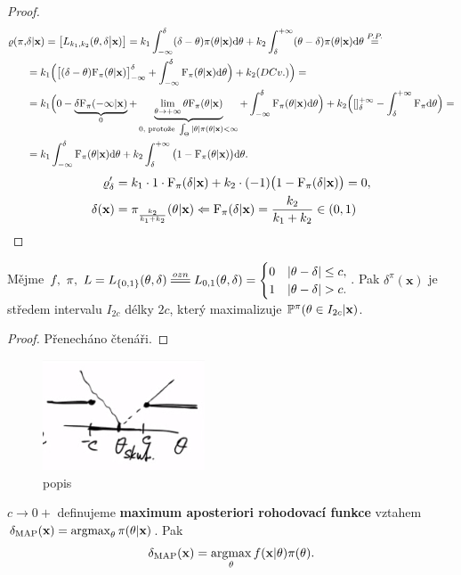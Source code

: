 \begin{theorem}
\begin{enumerate}[a:]
		\begin{proof}
			\[
			\begin{split}
			\varrho(\pi,&\delta|\textbf{x})=\big[L_{k_1,k_2}(\theta,\delta\big| \textbf{x})\big]=k_1\int_{-\infty}^\delta (\delta-\theta)\pi(\theta|\textbf{x})\mathrm{d}\theta+k_2\int_\delta^{+\infty}(\theta-\delta)\pi(\theta|\textbf{x})\mathrm{d}\theta\stackrel{P.P.}{=}\\&=k_1\Big(\big[(\delta-\theta)\mathrm{F}_\pi(\theta|\textbf{x})\big]_{-\infty}^\delta+\int_{-\infty}^\delta \mathrm{F}_\pi(\theta|\textbf{x})\mathrm{d}\theta\Big)+k_2(DCv.)\Big)=\\&=k_1\Big( 0-\underbrace{\delta\mathrm{F}_\pi(-\infty|\textbf{x})}_{0}+\underbrace{\lim\limits_{\theta\to+\infty}\theta\mathrm{F}_\pi(\theta|\textbf{x})}_{0\text{, protože }\int_\Theta |\theta|\pi(\theta|\textbf{x})<\infty}+\int_{-\infty}^\delta \mathrm{F}_\pi(\theta|\textbf{x})\mathrm{d}\theta \Big)+k_2\Big( []_\delta^{+\infty}-\int_\delta^{+\infty}\mathrm{F}_\pi \mathrm{d}\theta \Big)=\\&=k_1\int_{-\infty}^\delta \mathrm{F}_\pi(\theta|\textbf{x})\mathrm{d}\theta+k_2\int_\delta^{+\infty}\big(1-\mathrm{F}_\pi(\theta|\textbf{x})\big)\mathrm{d}\theta.
			\end{split}
			\]
			\[
			\begin{split}
			\varrho_\delta'&=k_1\cdot 1\cdot\mathrm{F}_\pi(\delta|\textbf{x})+k_2\cdot(-1)\big(1-\mathrm{F}_\pi(\delta|\textbf{x})\big)=0,\\\delta(\textbf{x})&=\pi_{\frac{k_2}{k_1+k_2}}(\theta|\textbf{x}) \Leftarrow \mathrm{F}_\pi(\delta|\textbf{x})=\frac{k_2}{k_1+k_2}\in(0,1)
			\end{split}
			\]
		\end{proof} 
	\end{enumerate}
	
\end{theorem}
\begin{theorem}
	Mějme $f,~\pi,~L=L_{\{0,1\}}(\t,\delta)\equal{ozn}L_{0,1}(\t,\delta)=\begin{cases}
	0&|\t-\delta|\leq c,\\1& |\t-\delta|>c.
	\end{cases}$. Pak $\delta^\pi(\textbf{x})$ je středem intervalu $I_{2c}$ délky $2c$, který maximalizuje $\mathbb{P}^\pi(\theta\in I_{2c}|\textbf{x})$.
	\begin{proof}
		Přenecháno čtenáři.
	\end{proof}
\begin{figure}[h]
	\centering
	\includegraphics[width=0.7\linewidth]{pictures/10.12-2}
	\caption{popis}
	\label{fig:105}
\end{figure}
\end{theorem}

\begin{define}
	$c\to 0+$ definujeme \textbf{maximum aposteriori rohodovací funkce} vztahem $\delta_\mathrm{MAP}(\textbf{x})=\mathop{\mathrm{argmax}}_\theta \pi(\theta|\textbf{x})$. Pak $$\delta_\mathrm{MAP}(\textbf{x})=\mathop{\mathrm{argmax}}_\theta f(\textbf{x}|\theta)\pi(\theta).$$
\end{define}


